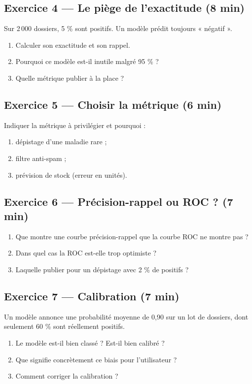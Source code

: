 \subsection*{Exercice 4 --- Le piège de l'exactitude \hfill \normalfont\footnotesize (8 min)}
Sur 2\,000 dossiers, 5 \% sont positifs. Un modèle prédit toujours « négatif ».
\begin{enumerate}
  \item Calculer son exactitude et son rappel.
  \item Pourquoi ce modèle est-il inutile malgré 95 \% ?
  \item Quelle métrique publier à la place ?
\end{enumerate}

\subsection*{Exercice 5 --- Choisir la métrique \hfill \normalfont\footnotesize (6 min)}
Indiquer la métrique à privilégier et pourquoi :
\begin{enumerate}
  \item dépistage d'une maladie rare ;
  \item filtre anti-spam ;
  \item prévision de stock (erreur en unités).
\end{enumerate}


\subsection*{Exercice 6 --- Précision-rappel ou ROC ? \hfill \normalfont\footnotesize (7 min)}
\begin{enumerate}
  \item Que montre une courbe précision-rappel que la courbe ROC ne montre pas ?
  \item Dans quel cas la ROC est-elle trop optimiste ?
  \item Laquelle publier pour un dépistage avec 2 \% de positifs ?
\end{enumerate}

\subsection*{Exercice 7 --- Calibration \hfill \normalfont\footnotesize (7 min)}
Un modèle annonce une probabilité moyenne de 0,90 sur un lot de dossiers, dont
seulement 60 \% sont réellement positifs.
\begin{enumerate}
  \item Le modèle est-il bien classé ? Est-il bien calibré ?
  \item Que signifie concrètement ce biais pour l'utilisateur ?
  \item Comment corriger la calibration ?
\end{enumerate}

